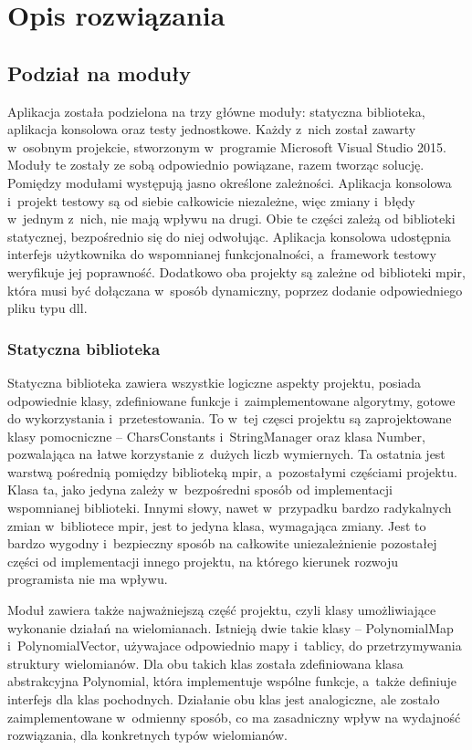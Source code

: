 \chapter{Opis rozwiązania}
\section{Podział na moduły}

Aplikacja została podzielona na trzy główne moduły: statyczna biblioteka, aplikacja konsolowa oraz testy jednostkowe. Każdy z~nich został zawarty w~osobnym projekcie, stworzonym w~programie Microsoft Visual Studio 2015. Moduły te zostały ze sobą odpowiednio powiązane, razem tworząc solucję. Pomiędzy modułami występują jasno określone zależności. Aplikacja konsolowa i~projekt testowy są od siebie całkowicie niezależne, więc zmiany i~błędy w~jednym z~nich, nie mają wpływu na drugi. Obie te części zależą od biblioteki statycznej, bezpośrednio się do niej odwołując. Aplikacja konsolowa udostępnia interfejs użytkownika do wspomnianej funkcjonalności, a~framework testowy weryfikuje jej poprawność. Dodatkowo oba projekty są zależne od biblioteki mpir, która musi być dołączana w~sposób dynamiczny, poprzez dodanie odpowiedniego pliku typu dll. 

\subsection{Statyczna biblioteka}

Statyczna biblioteka zawiera wszystkie logiczne aspekty projektu, posiada odpowiednie klasy, zdefiniowane funkcje i~zaimplementowane algorytmy, gotowe do wykorzystania i~przetestowania. To w~tej częsci projektu są zaprojektowane klasy pomocniczne -- CharsConstants i~StringManager oraz klasa Number, pozwalająca na łatwe korzystanie z~dużych liczb wymiernych. Ta ostatnia jest warstwą pośrednią pomiędzy biblioteką mpir, a~pozostałymi częściami projektu. Klasa ta, jako jedyna zależy w~bezpośredni sposób od implementacji wspomnianej biblioteki. Innymi słowy, nawet w~przypadku bardzo radykalnych zmian w~bibliotece mpir, jest to jedyna klasa, wymagająca zmiany. Jest to bardzo wygodny i~bezpieczny sposób na całkowite uniezależnienie pozostałej części od implementacji innego projektu, na którego kierunek rozwoju programista nie ma wpływu.

Moduł zawiera także najważniejszą część projektu, czyli klasy umożliwiające wykonanie działań na wielomianach. Istnieją dwie takie klasy -- PolynomialMap i~PolynomialVector, używajace odpowiednio mapy i~tablicy, do przetrzymywania struktury wielomianów. Dla obu takich klas została zdefiniowana klasa abstrakcyjna Polynomial, która implementuje wspólne funkcje, a~także definiuje interfejs dla klas pochodnych. Działanie obu klas jest analogiczne, ale zostało zaimplementowane w~odmienny sposób, co ma zasadniczny wpływ na wydajność rozwiązania, dla konkretnych typów wielomianów.

